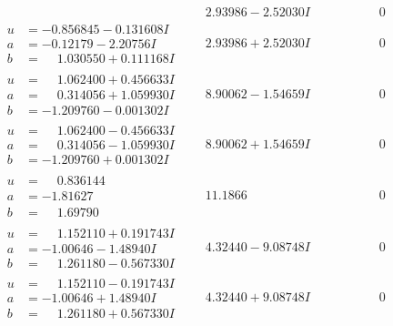 \documentclass[1p]{elsarticle_modified}
\theoremstyle{definition}
\begin{document}
$$\begin{array}{c|c|c}
 & \phantom{-}2.93986 - 2.52030 I & \phantom{-0.000000 } 0 \\ \hline\begin{aligned}
u &= -0.856845 - 0.131608 I \\
a &= -0.12179 - 2.20756 I \\
b &= \phantom{-}1.030550 + 0.111168 I\end{aligned}
 & \phantom{-}2.93986 + 2.52030 I & \phantom{-0.000000 } 0 \\ \hline\begin{aligned}
u &= \phantom{-}1.062400 + 0.456633 I \\
a &= \phantom{-}0.314056 + 1.059930 I \\
b &= -1.209760 - 0.001302 I\end{aligned}
 & \phantom{-}8.90062 - 1.54659 I & \phantom{-0.000000 } 0 \\ \hline\begin{aligned}
u &= \phantom{-}1.062400 - 0.456633 I \\
a &= \phantom{-}0.314056 - 1.059930 I \\
b &= -1.209760 + 0.001302 I\end{aligned}
 & \phantom{-}8.90062 + 1.54659 I & \phantom{-0.000000 } 0 \\ \hline\begin{aligned}
u &= \phantom{-}0.836144\phantom{ +0.000000I} \\
a &= -1.81627\phantom{ +0.000000I} \\
b &= \phantom{-}1.69790\phantom{ +0.000000I}\end{aligned}
 & \phantom{-}11.1866\phantom{ +0.000000I} & \phantom{-0.000000 } 0 \\ \hline\begin{aligned}
u &= \phantom{-}1.152110 + 0.191743 I \\
a &= -1.00646 - 1.48940 I \\
b &= \phantom{-}1.261180 - 0.567330 I\end{aligned}
 & \phantom{-}4.32440 - 9.08748 I & \phantom{-0.000000 } 0 \\ \hline\begin{aligned}
u &= \phantom{-}1.152110 - 0.191743 I \\
a &= -1.00646 + 1.48940 I \\
b &= \phantom{-}1.261180 + 0.567330 I\end{aligned}
 & \phantom{-}4.32440 + 9.08748 I & \phantom{-0.000000 } 0 \\ \hline\begin{aligned}

\end{aligned}
\end{array}$$
\end{document}
